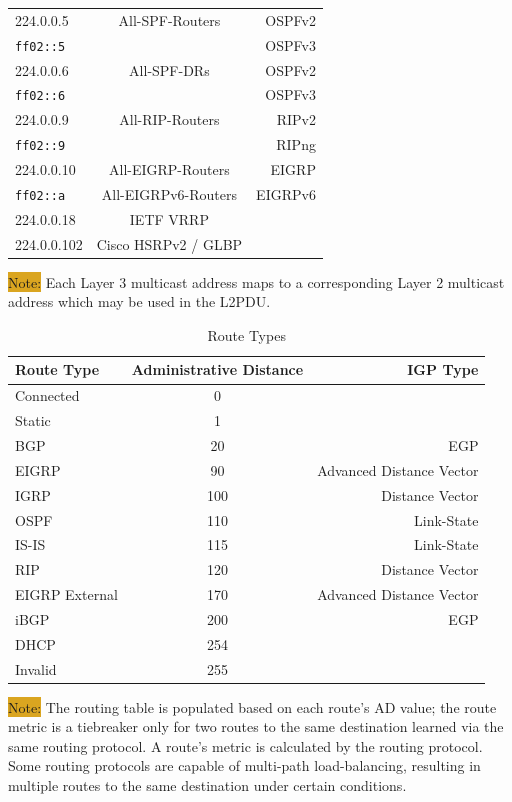 \documentclass[12pt]{article}
\newcommand{\note}[1]{\colorbox{#1}{Note:}}
\begin{document}
\begin{table}[H]
\begin{minipage}{.6\linewidth}
\begin{tabular}{| l | c | r|}
	224.0.0.5		& All-SPF-Routers	& OSPFv2\\
	\texttt{ff02::5}	&				& OSPFv3\\\hline
	224.0.0.6		& All-SPF-DRs		& OSPFv2\\
	\texttt{ff02::6}	&				& OSPFv3\\\hline
	224.0.0.9		& All-RIP-Routers		& RIPv2\\
	\texttt{ff02::9}	&				& RIPng\\\hline
	224.0.0.10		& All-EIGRP-Routers	& EIGRP\\
	\texttt{ff02::a}	& All-EIGRPv6-Routers	& EIGRPv6\\\hline
	224.0.0.18		& IETF VRRP		&\\\hline
	224.0.0.102		& Cisco HSRPv2 / GLBP	&\\\hline
	\end{tabular}\end{minipage}\end{table}
	\note{Goldenrod} Each Layer 3 multicast address maps to a corresponding Layer 2 multicast address which may be used in the L2PDU.

	\begin{table}[H]
	\centering
	\caption{Route Types \label{tab:ROUTE TYPES}}
	\begin{tabular}{lcr}
	\hline
	\textbf{Route Type}	& \textbf{Administrative Distance}	& \textbf{IGP Type}\\\hline
	Connected			& 0						&\\\hline
	Static				& 1						&\\\hline
	BGP				& 20						& EGP\\\hline
	EIGRP				& 90						& Advanced Distance Vector\\\hline
	IGRP				& 100						& Distance Vector\\\hline
	OSPF				& 110						& Link-State\\\hline
	IS-IS				& 115						& Link-State\\\hline
	RIP				& 120						& Distance Vector\\\hline
	EIGRP External		& 170						& Advanced Distance Vector\\\hline
	iBGP				& 200						& EGP\\\hline
	DHCP			& 254						&\\\hline
	Invalid			& 255						&\\\hline
	\end{tabular}\end{table}
	\note{Goldenrod} The routing table is populated based on each route's AD value; the route metric is a tiebreaker only for two routes to the same destination learned via the same routing protocol. A route's metric is calculated by the routing protocol. Some routing protocols are capable of multi-path load-balancing, resulting in multiple routes to the same destination under certain conditions.
\end{document}
